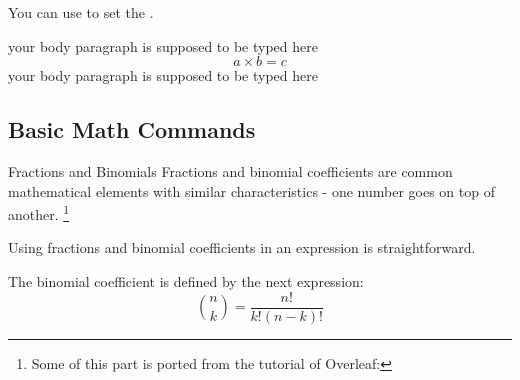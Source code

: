 \begin{frame}[fragile]
You can use \LC{\setlength} to set the . \medskip
	
\begin{command}
\begin{LCL}
\setlength{}
\setlength{}
\end{LCL}
\end{command}

\begin{latexexample}
\setlength\abovedisplayskip{0em}
\setlength\belowdisplayskip{0em}
your body paragraph is supposed to be typed here
\begin{equation}
  a \times b = c 
\end{equation}
your body paragraph is supposed to be typed here
\end{latexexample}

\end{frame}




\subsection{Basic Math Commands}

\begin{frame}[fragile]{Fractions and Binomials}
Fractions and binomial coefficients are common mathematical elements with similar characteristics - one number goes on top of another. \footnote[1]{Some of this part is ported from the tutorial of Overleaf: } 

\begin{command}
\begin{LCL}
\end{LCL}
\end{command}

Using fractions and binomial coefficients in an expression is straightforward.

\begin{latexexample}
The binomial coefficient is defined by the next expression:
\[ \binom{n}{k} = \frac{n!}{k!(n-k)!} \]
\end{latexexample}

\end{frame}

